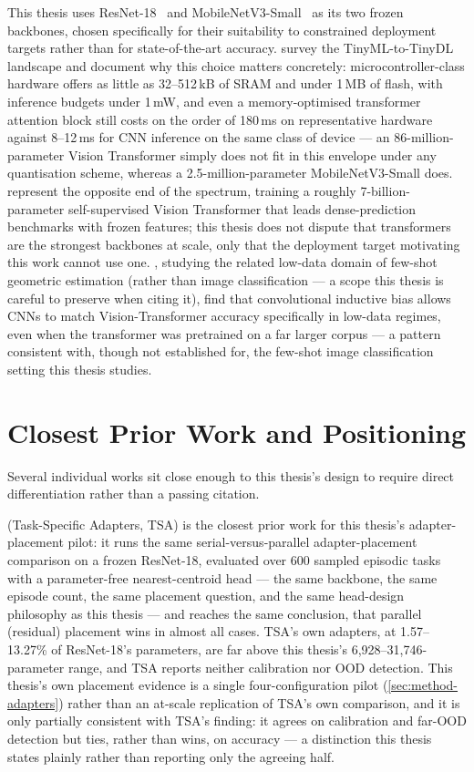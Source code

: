 \documentclass{iutbscthesis}
\begin{document}
This thesis uses ResNet-18~\cite{he2016resnet} and MobileNetV3-Small~\cite{howard2019mobilenetv3} as its two frozen backbones, chosen specifically for their suitability to constrained deployment targets rather than for state-of-the-art accuracy. \textcite{somvanshi2025tinydl} survey the TinyML-to-TinyDL landscape and document why this choice matters concretely: microcontroller-class hardware offers as little as 32--512\,kB of SRAM and under 1\,MB of flash, with inference budgets under 1\,mW, and even a memory-optimised transformer attention block still costs on the order of 180\,ms on representative hardware against 8--12\,ms for CNN inference on the same class of device — an 86-million-parameter Vision Transformer simply does not fit in this envelope under any quantisation scheme, whereas a 2.5-million-parameter MobileNetV3-Small does. \textcite{simeoni2025dinov3} represent the opposite end of the spectrum, training a roughly 7-billion-parameter self-supervised Vision Transformer that leads dense-prediction benchmarks with frozen features; this thesis does not dispute that transformers are the strongest backbones at scale, only that the deployment target motivating this work cannot use one. \textcite{kaya2025cnnvit}, studying the related low-data domain of few-shot geometric estimation (rather than image classification — a scope this thesis is careful to preserve when citing it), find that convolutional inductive bias allows CNNs to match Vision-Transformer accuracy specifically in low-data regimes, even when the transformer was pretrained on a far larger corpus — a pattern consistent with, though not established for, the few-shot image classification setting this thesis studies.

\section{Closest Prior Work and Positioning}
\label{sec:related-positioning}

Several individual works sit close enough to this thesis's design to require direct differentiation rather than a passing citation.

\textcite{li2022tsa} (Task-Specific Adapters, TSA) is the closest prior work for this thesis's adapter-placement pilot: it runs the same serial-versus-parallel adapter-placement comparison on a frozen ResNet-18, evaluated over 600 sampled episodic tasks with a parameter-free nearest-centroid head — the same backbone, the same episode count, the same placement question, and the same head-design philosophy as this thesis — and reaches the same conclusion, that parallel (residual) placement wins in almost all cases. TSA's own adapters, at 1.57--13.27\% of ResNet-18's parameters, are far above this thesis's 6{,}928--31{,}746-parameter range, and TSA reports neither calibration nor OOD detection. This thesis's own placement evidence is a single four-configuration pilot (\autoref{sec:method-adapters}) rather than an at-scale replication of TSA's own comparison, and it is only partially consistent with TSA's finding: it agrees on calibration and far-OOD detection but ties, rather than wins, on accuracy — a distinction this thesis states plainly rather than reporting only the agreeing half.
\end{document}
